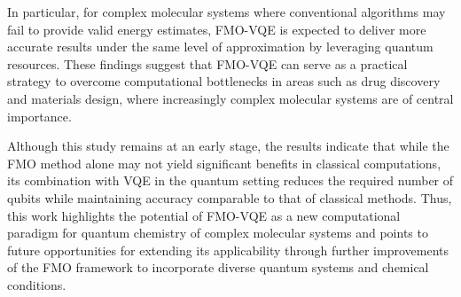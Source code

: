 \documentclass[pdflatex,sn-mathphys-num]{sn-jnl}%
\theoremstyle{thmstyleone}%
\theoremstyle{thmstyletwo}%
\theoremstyle{thmstylethree}%
\begin{document}
In particular, for complex molecular systems where conventional algorithms may fail to provide valid energy estimates, FMO-VQE is expected to deliver more accurate results under the same level of approximation by leveraging quantum resources. These findings suggest that FMO-VQE can serve as a practical strategy to overcome computational bottlenecks in areas such as drug discovery and materials design, where increasingly complex molecular systems are of central importance.

Although this study remains at an early stage, the results indicate that while the FMO method alone may not yield significant benefits in classical computations, its combination with VQE in the quantum setting reduces the required number of qubits while maintaining accuracy comparable to that of classical methods. Thus, this work highlights the potential of FMO-VQE as a new computational paradigm for quantum chemistry of complex molecular systems and points to future opportunities for extending its applicability through further improvements of the FMO framework to incorporate diverse quantum systems and chemical conditions.
% 

\end{document}
